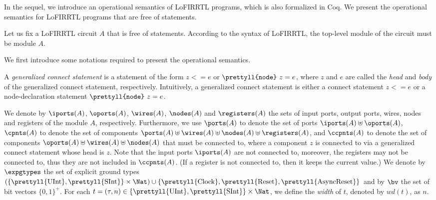 
In the sequel, we introduce an operational semantics of LoFIRRTL programs, 
which is also formalized in Coq.
We present the operational semantics for LoFIRRTL programs that are free of  statements.



Let us fix a LoFIRRTL circuit $A$ that is free of  statements. According to the syntax of LoFIRRTL, the top-level module of the circuit must be module $A$.

We first introduce some notations required to present the operational semantics.


A \emph{generalized connect statement} is a statement of the form $z <= e$ or $\mbox{\tt \prettyll{node}}\ z = e$, where $z$ and $e$ are called the \emph{head} and \emph{body} of the generalized connect statement, respectively. Intuitively, a generalized connect statement is either a connect statement $z <= e$ or a node-declaration statement $\mbox{\tt \prettyll{node}}\ z = e$.


We denote by $\iports(A)$, $\oports(A)$, $\wires(A)$, $\nodes(A)$
and $\registers(A)$ the sets of input ports, output ports, wires, nodes and registers of the module $A$, respectively.
Furthermore, we use $\ports(A)$ to denote the set of ports $\iports(A) \uplus \oports(A)$,
$\cpnts(A)$ to denote the set of components $\ports(A) \uplus \wires(A) \uplus \nodes(A) \uplus \registers(A)$,
and $\ccpnts(A)$ to denote the set of components $\oports(A) \uplus \wires(A) \uplus \nodes(A)$ that must be connected to, %
where a component $z$ is connected to via a generalized connect statement whose head is $z$.
Note that the input ports $\iports(A)$ are not connected to, moreover, the registers may not be connected to, thus they
are not included in $\ccpnts(A)$. (If a register is not connected to, then it keeps the current value.)
We denote by $\expgtypes$ the set of explicit ground types $(\{\mbox{\prettyll{UInt}}, \mbox{\prettyll{SInt}}\} \times \Nat) \cup \{\mbox{\prettyll{Clock}},
\mbox{\prettyll{Reset}}, \mbox{\prettyll{AsyncReset}}\}$ and by $\bv$ the set of bit vectors $\{0,1\}^+$.
For each $t = (\tau, n) \in \{\mbox{\prettyll{UInt}}, \mbox{\prettyll{SInt}}\} \times \Nat$, we define the \emph{width} of $t$, denoted by $wd(t)$, as $n$.



